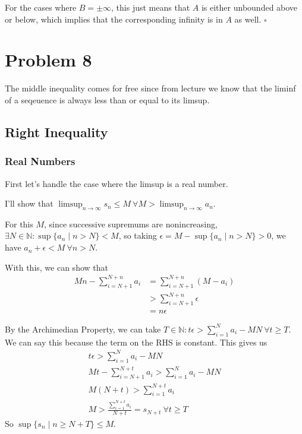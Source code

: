 \documentclass[12pt]{article}
\newcommand{\N}{\mathbb{N}}
\begin{document}
For the cases where $B=\pm \infty$, this just means that $A$ is either
unbounded above or below, which implies that the corresponding infinity is in $A$ as well. $\square$

\pagebreak

\section{Problem 8}

The middle inequality comes for free since from lecture we know that the
liminf of a seqeuence is always less than or equal to its limsup.

\subsection{Right Inequality}

\subsubsection{Real Numbers}

First let's handle the case where the limsup is a real number.

I'll show that $\limsup_{n \to \infty} s_n \le M\ \forall M > \limsup_{n \to \infty} a_n$.

For this $M$, since successive supremums are nonincreasing,
$\exists N \in \N: \sup \{a_n \mid n > N\} < M$,
so taking $\epsilon = M - \sup \{a_n \mid n > N\} > 0$, we have $a_n + \epsilon < M\ \forall n > N$.

With this, we can show that
\begin{align*}
  Mn - \sum_{i=N+1}^{N+n} a_i
   & = \sum_{i=N+1}^{N+n} (M - a_i) \\
   & > \sum_{i=N+1}^{N+n} \epsilon  \\
   & = n\epsilon
\end{align*}

By the Archimedian Property, we can take $T \in \N: t\epsilon > \sum_{i=1}^{N} a_i - MN\ \forall t \ge T$.
We can say this because the term on the RHS is constant.
This gives us
\begin{gather*}
  t\epsilon > \sum_{i=1}^{N} a_i - MN \\
  Mt - \sum_{i=N+1}^{N+t} a_i > \sum_{i=1}^{N} a_i - MN \\
  M(N+t) > \sum_{i=1}^{N+t} a_i \\
  M > \frac{\sum_{i=1}^{N+t} a_i}{N+t} = s_{N+t}\ \forall t \ge T
\end{gather*}
So $\sup \{s_n \mid n \ge N+T\} \le M$.
\end{document}

